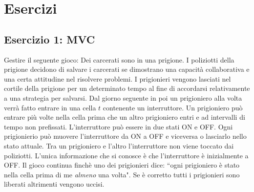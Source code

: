 \documentclass{article}
\begin{document}
\section{Esercizi}



\subsection{Esercizio 1: MVC}
\begin{framed}
Gestire il seguente gioco:
Dei carcerati sono in una prigione. I poliziotti della prigione decidono di salvare i carcerati se dimostrano una capacit\`a collaborativa e una certa attitudine nel risolvere problemi. I prigionieri vengono lasciati nel cortile della prigione per un determinato tempo al fine di accordarsi relativamente a una strategia per salvarsi. Dal giorno seguente in poi un prigioniero alla volta verr\`a fatto entrare in una cella $t$ contenente un interruttore.
Un prigioniero pu\`o  entrare pi\`u volte nella cella prima che un altro prigioniero entri e ad intervalli di tempo non prefissati. L'interruttore pu\`o essere in due stati ON e OFF. Ogni prigionierio pu\`o muovere l'interruttore da ON a OFF e viceversa o lasciarlo nello stato  attuale. Tra un prigioniero e l'altro l'interruttore non viene toccato dai poliziotti. L'unica informazione che si conosce \`e che l'interruttore \`e inizialmente a OFF. Il gioco continua finch\`e uno dei prigionieri dice: ``ogni prigioniero \`e stato nella cella prima di me \emph{almeno} una volta". Se \`e corretto tutti i prigionieri sono liberati altrimenti vengono uccisi.
\end{framed}
\clearpage
\end{document}

